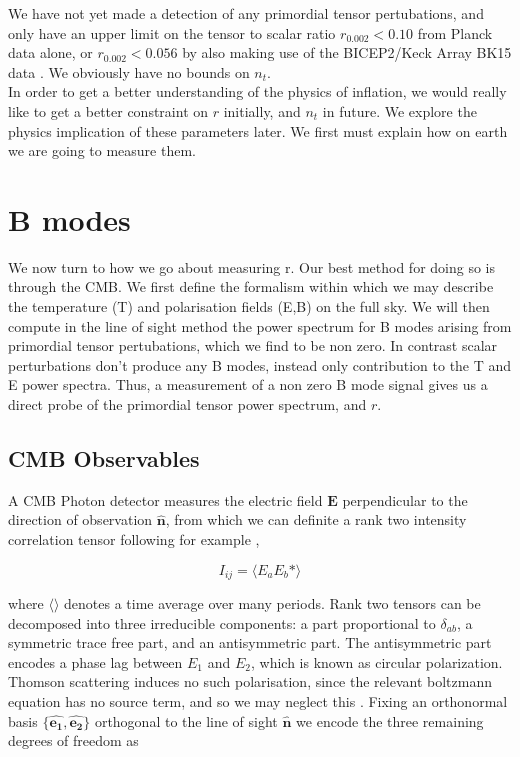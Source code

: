 \documentclass[a4paper,10pt]{article}
\renewcommand{\v}[1]{\mathbf{#1}}
\newcommand{\unit}[1]{\hat{\v{#1}}}
\begin{document}
We have not yet made a detection of any primordial tensor pertubations, and only have an upper limit on the tensor to scalar ratio $r_{0.002}<0.10$ from Planck data alone, or $r_{0.002}<0.056$ by also making use of the BICEP2/Keck Array BK15 data \cite{planck-inflation}. We obviously have no bounds on $n_t$.\\

In order to get a better understanding of the physics of inflation, we would really like to get a better constraint on $r$ initially, and $n_t$ in future. We explore the physics implication of these parameters later. We first must explain how on earth we are going to measure them.


\section{B modes}

We now turn to how we go about measuring r. Our best method for doing so is through the CMB. We first define the formalism within which we may describe the temperature (T) and polarisation fields (E,B) on the full sky. We will then compute in the line of sight method the power spectrum for B modes arising from primordial tensor pertubations, which we find to be non zero. In contrast scalar perturbations don't produce any B modes, instead only contribution to the T and E power spectra. Thus, a measurement of a non zero B mode signal gives us a direct probe of the primordial tensor power spectrum, and $r$. 

\subsection{CMB Observables}

A CMB Photon detector measures the electric field $\v{E}$ perpendicular to the direction of observation $\hat{\v{n}}$, from which we can definite a rank two intensity correlation tensor following for example \cite{lewis}, \cite{baldauf}

\begin{equation}
I_{ij} = \langle E_aE_b* \rangle
\end{equation}

where $\langle\rangle$ denotes a time average over many periods. Rank two tensors can be decomposed into three irreducible components: a part proportional to $\delta_{ab}$, a symmetric trace free part, and an antisymmetric part. The antisymmetric part encodes a phase lag between $E_1$ and $E_2$, which is known as circular polarization. Thomson scattering induces no such polarisation, since the relevant boltzmann equation has no source term, and so we may neglect this \cite{Kowosky}. Fixing an orthonormal basis $\{\unit{e_1},\unit{e_2}\}$ orthogonal to the line of sight $\unit{n}$ we encode the three remaining degrees of freedom as 
\end{document}
